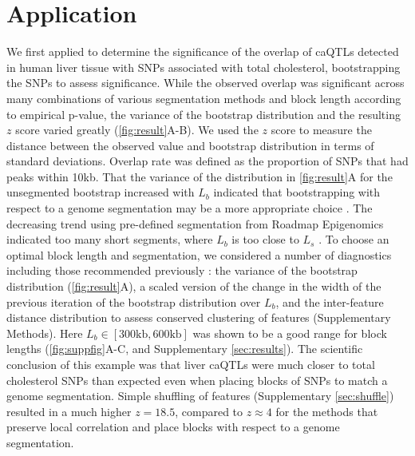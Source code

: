 \vspace*{-20pt}
\section{Application}

We first applied \bootranges to determine the significance of the
overlap of caQTLs detected in human liver tissue
\citep{CURRIN20211169} with SNPs associated with total cholesterol,
bootstrapping the SNPs to assess significance.
While the observed overlap was significant across many combinations of
various segmentation methods and block length according to empirical p-value, 
the variance of the
bootstrap distribution and the resulting $z$ score varied greatly
(\cref{fig:result}A-B).
We used the $z$ score to measure the distance between the observed
value and bootstrap distribution in terms of standard deviations.
Overlap rate was defined as the proportion of
SNPs that had peaks within 10kb.
That the variance of the distribution in \cref{fig:result}A for the
unsegmented bootstrap increased with $L_b$ indicated that
bootstrapping with respect to a genome
segmentation may be a more appropriate choice
\citep{bickel2010subsampling}. 
The decreasing trend using pre-defined segmentation from
Roadmap Epigenomics indicated too many short segments,
where $L_b$ is too close to $L_s$ .
To choose an optimal block length and segmentation, 
we considered a number of diagnostics including
those recommended previously \citep{bickel2010subsampling}:
the variance of the bootstrap distribution (\cref{fig:result}A),
a scaled version of the change in the width of the previous iteration
of the
bootstrap distribution over $L_b$,
and the inter-feature distance distribution to assess conserved
clustering of features (Supplementary Methods).
Here $L_b \in [300\textrm{kb},600\textrm{kb}]$ was shown to be a good range for block
lengths (\cref{fig:suppfig}A-C, and Supplementary \cref{sec:results}).
The scientific conclusion of this example was that liver caQTLs were
much closer to total cholesterol SNPs than expected even when placing
blocks of SNPs to match a genome segmentation.
Simple shuffling of features (Supplementary \cref{sec:shuffle})
resulted in a much higher $z = 18.5$, compared to $z \approx 4$ for
the methods that preserve local correlation and place blocks with
respect to a genome segmentation.


